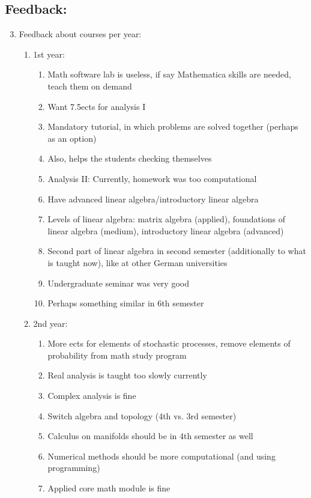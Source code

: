 \subsection{Feedback:}
\label{sec-1-2}
\begin{enumerate}
\setcounter{enumi}{2}
\item Feedback about courses per year:
\begin{enumerate}
\item 1st year:
\begin{enumerate}
\item Math software lab is useless, if say Mathematica skills are needed, teach them on demand
\item Want 7.5ects for analysis I
\item Mandatory tutorial, in which problems are solved together (perhaps as an option)
\item Also, helps the students checking themselves
\item Analysis II: Currently, homework was too computational
\item Have advanced linear algebra/introductory linear algebra
\item Levels of linear algebra: matrix algebra (applied), foundations of linear algebra (medium), introductory linear algebra (advanced)
\item Second part of linear algebra in second semester (additionally to what is taught now), like at other German universities
\item Undergraduate seminar was very good
\item Perhaps something similar in 6th semester
\end{enumerate}
\item 2nd year:
\begin{enumerate}
\item More ects for elements of stochastic processes, remove elements of probability from math study program
\item Real analysis is taught too slowly currently
\item Complex analysis is fine
\item Switch algebra and topology (4th vs. 3rd semester)
\item Calculus on manifolds should be in 4th semester as well
\item Numerical methods should be more computational (and using programming)
\item Applied core math module is fine
\end{enumerate}

\end{enumerate}
\end{enumerate}
